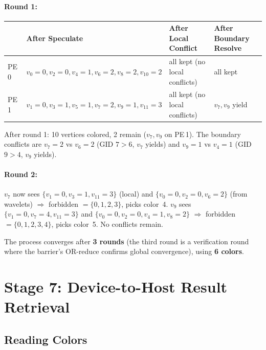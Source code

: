 \documentclass[11pt,letterpaper]{article}
\begin{document}
\paragraph{Round 1:}
\begin{center}
\renewcommand{\arraystretch}{1.2}
\begin{tabular}{llll}
\toprule
& \textbf{After Speculate} & \textbf{After Local Conflict} & \textbf{After Boundary Resolve} \\
\midrule
PE\,0 & $v_0{=}0, v_2{=}0, v_4{=}1, v_6{=}2, v_8{=}2, v_{10}{=}2$ & all kept (no local conflicts) & all kept \\
PE\,1 & $v_1{=}0, v_3{=}1, v_5{=}1, v_7{=}2, v_9{=}1, v_{11}{=}3$ & all kept (no local conflicts) & $v_7, v_9$ yield \\
\bottomrule
\end{tabular}
\end{center}

After round 1: 10 vertices colored, 2 remain ($v_7, v_9$ on PE\,1). The boundary conflicts are $v_7{=}2$ vs $v_6{=}2$ (GID $7 > 6$, $v_7$ yields) and $v_9{=}1$ vs $v_4{=}1$ (GID $9 > 4$, $v_9$ yields).

\paragraph{Round 2:}
$v_7$ now sees $\{v_1{=}0, v_3{=}1, v_{11}{=}3\}$ (local) and $\{v_0{=}0, v_2{=}0, v_6{=}2\}$ (from wavelets) $\Rightarrow$ forbidden $= \{0,1,2,3\}$, picks color~4. $v_9$ sees $\{v_1{=}0, v_7{=}4, v_{11}{=}3\}$ and $\{v_0{=}0, v_2{=}0, v_4{=}1, v_8{=}2\}$ $\Rightarrow$ forbidden $= \{0,1,2,3,4\}$, picks color~5. No conflicts remain.

The process converges after \textbf{3 rounds} (the third round is a verification round where the barrier's OR-reduce confirms global convergence), using \textbf{6 colors}.

\section{Stage 7: Device-to-Host Result Retrieval}
\label{sec:d2h}

\subsection{Reading Colors}
\end{document}
